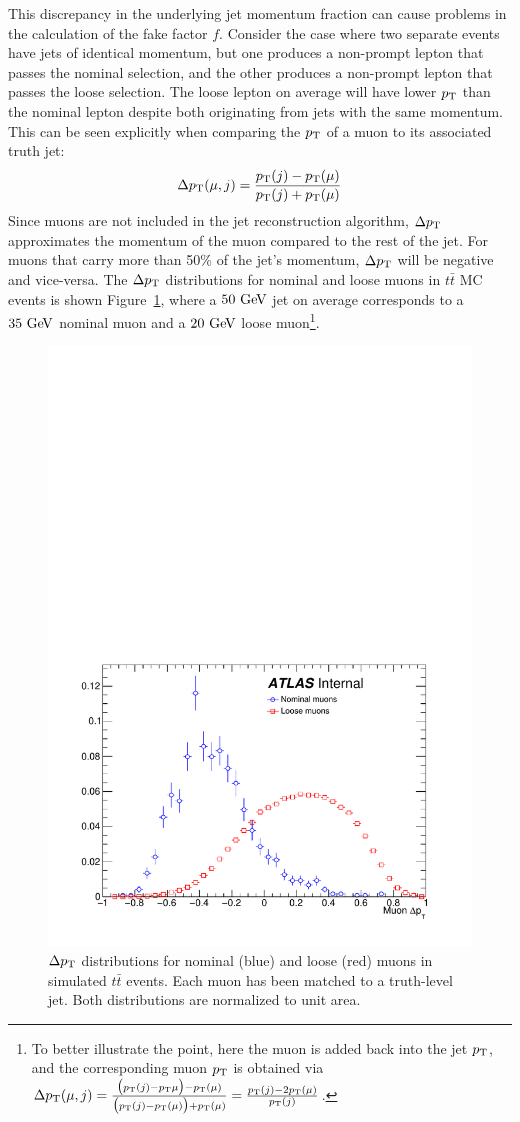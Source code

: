 This discrepancy in the underlying jet momentum fraction can cause problems in the calculation of the fake factor $f$.
Consider the case where two separate events have jets of identical momentum, but one produces a non-prompt lepton that passes the nominal selection, and the other produces a non-prompt lepton that passes the loose selection.
The loose lepton on average will have lower $p_{\mathrm{T}}$ than the nominal lepton despite both originating from jets with the same momentum.
This can be seen explicitly when comparing the $p_{\mathrm{T}}$ of a muon to its associated truth jet:
\begin{equation}
\Delta\pt(\mu,j) = \frac{\pt(j)-\pt(\mu)}{\pt(j)+\pt(\mu)}
\label{eq:ssww13tev_ff_deltapt}
\end{equation}
Since muons are not included in the jet reconstruction algorithm, $\Delta p_{\mathrm{T}}$ approximates the momentum of the muon compared to the rest of the jet.
For muons that carry more than 50\% of the jet's momentum, $\Delta p_{\mathrm{T}}$ will be negative and vice-versa.
The $\Delta p_{\mathrm{T}}$ distributions for nominal and loose muons in $t\bar{t}$ MC events is shown Figure~\ref{fig:ssww13tev_ff_deltapt}, where a $50\gev$ jet on average corresponds to a $35\gev$ nominal muon and a $20\gev$ loose muon\footnote{To better illustrate the point, here the muon is added back into the jet $p_{\mathrm{T}}$, and the corresponding muon $p_{\mathrm{T}}$ is obtained via $\Delta p_{\mathrm{T}}(\mu,j) = \frac{\big(p_{\mathrm{T}}(j)-p_{\mathrm{T}}{\mu}\big)-p_{\mathrm{T}}(\mu)}{\big(p_{\mathrm{T}}(j)-p_{\mathrm{T}}(\mu)\big)+p_{\mathrm{T}}(\mu)} = \frac{p_{\mathrm{T}}(j)-2p_{\mathrm{T}}(\mu)}{p_{\mathrm{T}}(j)}$.}.

\begin{figure}[htbp]
  \centering
  \includegraphics[width=.6\textwidth]{figs/ssww_13tev/backgrounds/ff/deltapt_ttbar}
  \caption{$\Delta p_{\mathrm{T}}$ distributions for nominal (blue) and loose (red) muons in simulated $t\bar{t}$ events.  Each muon has been matched to a truth-level jet.  Both distributions are normalized to unit area.}
  \label{fig:ssww13tev_ff_deltapt}
\end{figure}

